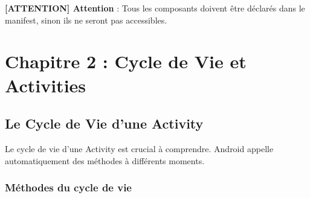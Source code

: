 \documentclass[11pt,a4paper]{article}
\begin{document}
\textbf{[ATTENTION] Attention} : Tous les composants doivent être déclarés dans le manifest, sinon ils ne seront pas accessibles.


\section{Chapitre 2 : Cycle de Vie et Activities}

\subsection{Le Cycle de Vie d'une Activity}

Le cycle de vie d'une Activity est crucial à comprendre. Android appelle automatiquement des méthodes à différents moments.

\subsubsection{Méthodes du cycle de vie}
\end{document}
